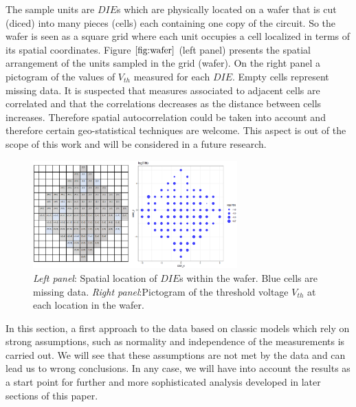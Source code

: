 \documentclass[sn-mathphys]{sn-jnl}%
\theoremstyle{thmstyleone}%
\theoremstyle{thmstyletwo}%
\theoremstyle{thmstylethree}%
\begin{document}
The sample units are $DIE$s which are physically  located on a wafer that is cut (diced) into many pieces (cells) each containing one copy of the circuit. So the wafer is seen as a square grid where each unit occupies a cell localized in terms of its spatial coordinates. 
Figure $\ref{fig:wafer}$ (left panel) presents the spatial arrangement of the units sampled in the grid (wafer). On the right panel a pictogram of the values of $V_{th}$ measured for each $DIE$. Empty cells represent missing data.
It is suspected that measures associated to  adjacent cells are correlated and that the correlations decreases as the distance between cells increases. Therefore spatial autocorrelation could be taken into account and therefore certain geo-statistical techniques are welcome. This aspect is out of the scope of this work and will be considered in a future research.%
\begin{figure}[ht]
	\centering
		\includegraphics[width=0.7\textwidth]{Fig1_wafer2.eps}
	\caption{{\it Left panel}: Spatial location of $DIE$s within the wafer. Blue cells are missing data. {\it Right panel}:Pictogram of the threshold voltage $V_{th}$ at each location in the wafer.}
	\label{fig:wafer}
\end{figure}

In this section, a first approach to the data based on classic models which rely on strong assumptions, such as normality and independence of the measurements is carried out. We will see that these assumptions are not met by the data and can lead us to wrong conclusions. In any case, we will have into account the results as a start point for further and more sophisticated analysis developed in later sections of this paper.
\end{document}
